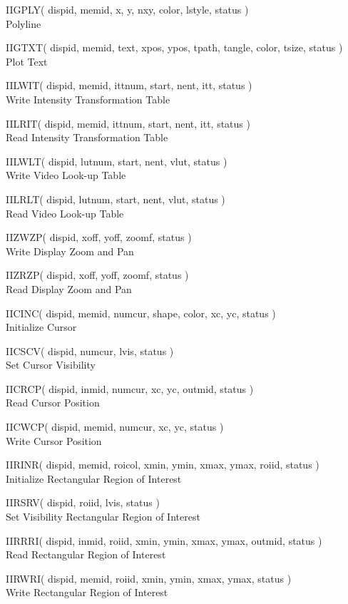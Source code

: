 \documentclass[11pt,nolof]{starlink}
\providecommand{\routinehead}[1]{\vspace{\bigskipamount}{\large\bf#1}}
\newenvironment{routinelist}{\begin{list}{}{\setlength{\leftmargin}{2cm}
                             \setlength{\parsep}{\smallskipamount}}}{\end{list}}
\providecommand{\noteroutine}[2]{\item\hspace{-1cm}#1#2\\}
\begin{document}
\routinehead{Graphics}
\begin{routinelist}
\noteroutine{IIGPLY}{( dispid, memid, x, y, nxy, color, lstyle, status )}
               {Polyline}
\noteroutine{IIGTXT}{( dispid, memid, text, xpos, ypos, tpath, tangle, color,
                        tsize, status )}
               {Plot Text}
\end{routinelist}
\routinehead{Look-up Table}
\begin{routinelist}
\noteroutine{IILWIT}{( dispid, memid, ittnum, start, nent, itt, status )}
               {Write Intensity Transformation Table}
\noteroutine{IILRIT}{( dispid, memid, ittnum, start, nent, itt, status )}
               {Read Intensity Transformation Table}
\noteroutine{IILWLT}{( dispid, lutnum, start, nent, vlut, status )}
               {Write Video Look-up Table}
\noteroutine{IILRLT}{( dispid, lutnum, start, nent, vlut, status )}
               {Read Video Look-up Table}
\end{routinelist}
\routinehead{Zoom and Pan}
\begin{routinelist}
\noteroutine{IIZWZP}{( dispid, xoff, yoff, zoomf, status )}
               {Write Display Zoom and Pan}
\noteroutine{IIZRZP}{( dispid, xoff, yoff, zoomf, status )}
               {Read Display Zoom and Pan}
\end{routinelist}
\routinehead{Cursor}
\begin{routinelist}
\noteroutine{IICINC}{( dispid, memid, numcur, shape, color, xc, yc, status )}
               {Initialize Cursor}
\noteroutine{IICSCV}{( dispid, numcur, lvis, status )}
               {Set Cursor Visibility}
\noteroutine{IICRCP}{( dispid, inmid, numcur, xc, yc, outmid, status )}
               {Read Cursor Position}
\noteroutine{IICWCP}{( dispid, memid, numcur, xc, yc, status )}
               {Write Cursor Position}
\end{routinelist}
\routinehead{Region of Interest}
\begin{routinelist}
\noteroutine{IIRINR}{( dispid, memid, roicol, xmin, ymin, xmax, ymax, roiid,
                        status )}
               {Initialize Rectangular Region of Interest}
\noteroutine{IIRSRV}{( dispid, roiid, lvis, status )}
               {Set Visibility Rectangular Region of Interest}
\noteroutine{IIRRRI}{( dispid, inmid, roiid, xmin, ymin, xmax, ymax, outmid,
                        status )}
               {Read Rectangular Region of Interest}
\noteroutine{IIRWRI}{( dispid, memid, roiid, xmin, ymin, xmax, ymax, status )}
               {Write Rectangular Region of Interest}
\end{routinelist}
\end{document}
